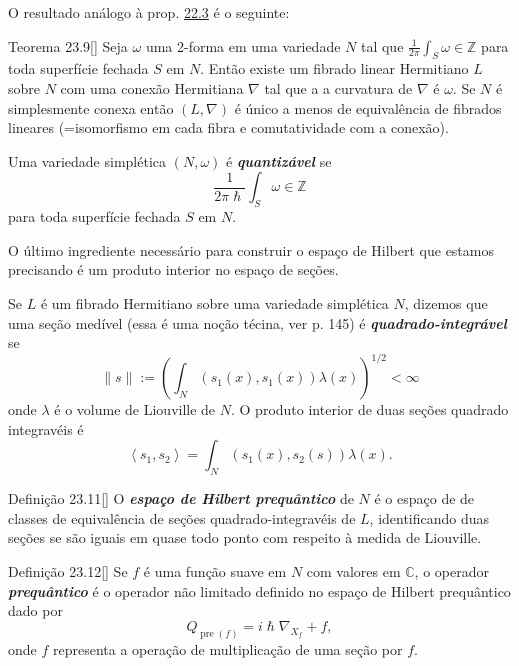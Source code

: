 O resultado análogo à prop. \hyperref[prop:22.3]{22.3} é o seguinte:

\begin{thing4}{Teorema 23.9}[\cite{hallq}]\leavevmode
Seja $\omega$ uma 2-forma em uma variedade $N$ tal que $\frac{1}{2\pi}\int_{S}\omega \in\mathbb{Z}$ para toda superfície fechada $S$ em $N$. Então existe um fibrado linear Hermitiano $L$ sobre $N$ com uma conexão Hermitiana $\nabla$ tal que a a curvatura de $\nabla$ é $\omega$. Se $N$ é simplesmente conexa então $(L,\nabla)$ é único a menos de equivalência de fibrados lineares (=isomorfismo em cada fibra e comutatividade com a conexão).	
\end{thing4}

\begin{defn}\leavevmode
	Uma variedade simplética $(N,\omega)$ é \textit{\textbf{quantizável}} se
	\[\frac{1}{2\pi\hslash}\int_{S}\omega \in \mathbb{Z}\]
	para toda superfície fechada $S$ em $N$.
\end{defn}

O último ingrediente necessário para construir o espaço de Hilbert que estamos precisando é um produto interior no espaço de seções.

\begin{defn}\leavevmode
	Se $L$ é um fibrado Hermitiano sobre uma variedade simplética $N$, dizemos que uma seção medível (essa é uma noção técina, ver \cite{hallq} p. 145) é \textit{\textbf{quadrado-integrável}} se 
	\[\|s\|:=\left( \int_{N}(s_1(x),s_1(x))\lambda(x) \right)^{1/2}<\infty\]
onde $\lambda$ é o volume de Liouville de $N$. O produto interior de duas seções quadrado integravéis é
\[\left<s_1,s_2\right>=\int_{N}(s_1(x),s_2(s))\lambda(x).\]
\end{defn}

\begin{thing4}{Definição 23.11}[\cite{hallq}]\leavevmode
O \textit{\textbf{espaço de Hilbert prequântico}} de $N$ é o espaço de de classes de equivalência de seções quadrado-integravéis de $L$, identificando duas seções se são iguais em quase todo ponto com respeito à medida de Liouville.
\end{thing4}

\begin{thing4}{Definição 23.12}[\cite{hallq}]\leavevmode
	Se $f$ é uma função suave em $N$ com valores em $\mathbb{C}$, o operador \textit{\textbf{prequântico}}  é o operador não limitado definido no espaço de Hilbert prequântico dado por
	\[Q_{\operatorname{pre}(f)}=i\hslash \nabla_{X_f}+f,\]
onde $f$ representa a operação de multiplicação de uma seção por $f$.
\end{thing4}

